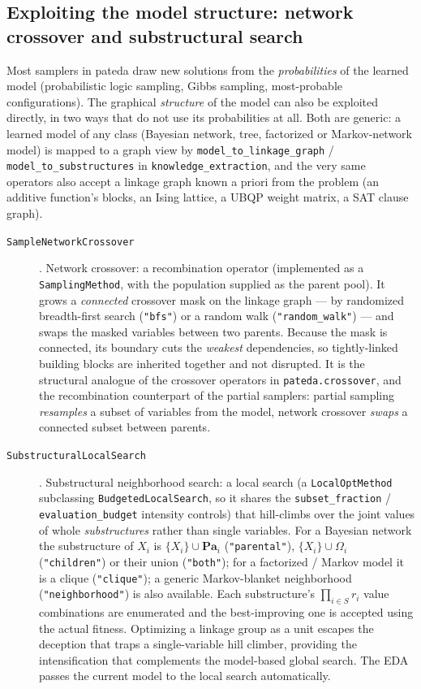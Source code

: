 \documentclass[a4paper,11pt]{article}
\begin{document}
\subsection{Exploiting the model structure: network crossover and substructural search}
\label{sec:structure_exploitation}

Most samplers in pateda draw new solutions from the \emph{probabilities} of the learned model (probabilistic logic sampling, Gibbs sampling, most-probable configurations).  The graphical \emph{structure} of the model can also be exploited directly, in two ways that do not use its probabilities at all.  Both are generic: a learned model of any class (Bayesian network, tree, factorized or Markov-network model) is mapped to a graph view by \texttt{model\_to\_linkage\_graph} / \texttt{model\_to\_substructures} in \texttt{knowledge\_extraction}, and the very same operators also accept a linkage graph known a priori from the problem (an additive function's blocks, an Ising lattice, a UBQP weight matrix, a SAT clause graph).

\begin{description}
  \item[\texttt{SampleNetworkCrossover}] \citep{Hauschild_and_Pelikan:2010}.
    Network crossover: a recombination operator (implemented as a \texttt{SamplingMethod}, with the population supplied as the parent pool).  It grows a \emph{connected} crossover mask on the linkage graph --- by randomized breadth-first search (\texttt{"bfs"}) or a random walk (\texttt{"random\_walk"}) --- and swaps the masked variables between two parents.  Because the mask is connected, its boundary cuts the \emph{weakest} dependencies, so tightly-linked building blocks are inherited together and not disrupted.  It is the structural analogue of the crossover operators in \texttt{pateda.crossover}, and the recombination counterpart of the partial samplers: partial sampling \emph{resamples} a subset of variables from the model, network crossover \emph{swaps} a connected subset between parents.

  \item[\texttt{SubstructuralLocalSearch}] \citep{Lima_et_al:2006}.
    Substructural neighborhood search: a local search (a \texttt{LocalOptMethod} subclassing \texttt{BudgetedLocalSearch}, so it shares the \texttt{subset\_fraction} / \texttt{evaluation\_budget} intensity controls) that hill-climbs over the joint values of whole \emph{substructures} rather than single variables.  For a Bayesian network the substructure of $X_i$ is $\{X_i\}\cup\mathbf{Pa}_i$ (\texttt{"parental"}), $\{X_i\}\cup\Omega_i$ (\texttt{"children"}) or their union (\texttt{"both"}); for a factorized / Markov model it is a clique (\texttt{"clique"}); a generic Markov-blanket neighborhood (\texttt{"neighborhood"}) is also available.  Each substructure's $\prod_{i\in S} r_i$ value combinations are enumerated and the best-improving one is accepted using the actual fitness.  Optimizing a linkage group as a unit escapes the deception that traps a single-variable hill climber, providing the intensification that complements the model-based global search.  The EDA passes the current model to the local search automatically.
\end{description}
\end{document}
